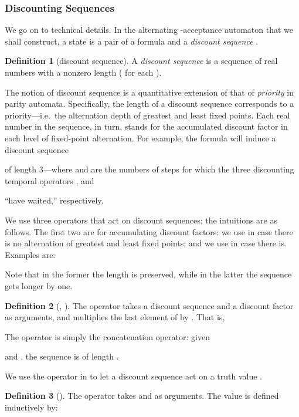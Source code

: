 \documentclass[a4paper,USenglish,numberwithinsect]{lipics}
\theoremstyle{definition}
\newtheorem{defi}{Definition}[section]
\theoremstyle{remark}
\theoremstyle{plain}
\begin{document}
\subsubsection{Discounting Sequences}\label{subsubsec:discountSeq}
 We go on to technical details.
 In the alternating -acceptance automaton
  that we shall construct, a state is a pair 
  of a formula  and a \emph{discount sequence} 
 .
\begin{defi}[discount sequence]\label{def:discountSequence}
 A \emph{discount sequence} is a sequence  of real numbers with a nonzero length ( for
 each ). 
\end{defi}
The notion of discount sequence is a quantitative extension of that of
\emph{priority} in parity automata. Specifically, the length  of a
discount sequence  corresponds to a
priority---i.e.\ the alternation depth of greatest and least fixed
points.
Each real number  in the sequence, in turn, stands for the accumulated 
discount factor in each level of fixed-point alternation. 
For example,  the formula 
   will induce a discount sequence

 of
 length 3---where  and  are the numbers of steps for
 which 
the three discounting temporal operators
, 
 and 

 ``have waited,'' respectively.

We use three operators  that act on discount
sequences; the 
intuitions are as follows. The first two are for accumulating discount
factors: we use 
in case there is no alternation of greatest and least fixed points; and
we use
 in case there is. Examples are:

Note that in the former the length is preserved, while in the latter the
sequence gets longer by one.
\begin{defi}[,  ]\label{def:operationsOnDiscountSeqOdotAndCdot}
 The  operator  
takes a discount sequence 
 and a discount factor  as arguments, and multiplies
 the last element of    by . That is,

The operator  is simply the concatenation operator: given 

 and  , the sequence  is  of length .
\end{defi}

We use the operator  in  to let a
discount sequence  act on a truth value . 
\begin{defi}[]\label{def:operationsOnDiscountSeq}
 The operator  takes 
 and  as
 arguments. The value  is defined inductively by:
 
\end{defi}
\end{document}
